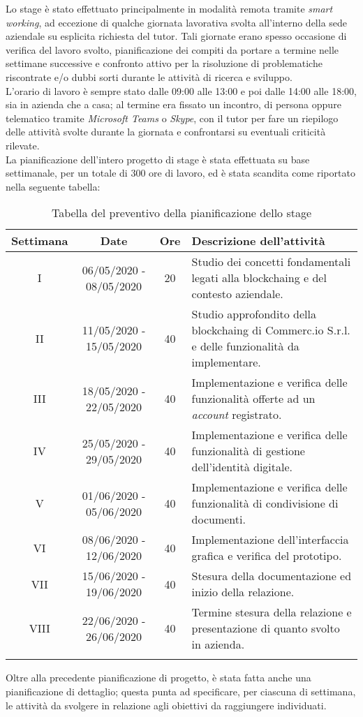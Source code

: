 Lo stage è stato effettuato principalmente in modalità remota tramite \textit{smart working}, ad eccezione di qualche giornata lavorativa svolta all'interno della sede aziendale su esplicita richiesta del tutor. Tali giornate erano spesso occasione di verifica del lavoro svolto, pianificazione dei compiti da portare a termine nelle settimane successive e confronto attivo per la risoluzione di problematiche riscontrate e/o dubbi sorti durante le attività di ricerca e sviluppo.\\
L'orario di lavoro è sempre stato dalle 09:00 alle 13:00 e poi dalle 14:00 alle 18:00, sia in azienda che a casa; al termine era fissato un incontro, di persona oppure telematico tramite \textit{Microsoft Teams} o \textit{Skype}, con il tutor per fare un riepilogo delle attività svolte durante la giornata e confrontarsi su eventuali criticità rilevate.\\
La pianificazione dell'intero progetto di stage è stata effettuata su base settimanale, per un totale di 300 ore di lavoro, ed è stata scandita come riportato nella seguente tabella:
\begin{longtable}{|c|c|c|p{5cm}|}
	\hline
	\rowcolor{gray}
	\textbf{Settimana} & \textbf{Date} & \textbf{Ore} & \textbf{Descrizione dell'attività} \\\hline
	I & 06/05/2020 - 08/05/2020 & 20 & Studio dei concetti fondamentali legati alla \gls{blockchaing} e del contesto aziendale. \\\hline
	II & 11/05/2020 - 15/05/2020 & 40 & Studio approfondito della \gls{blockchaing} di Commerc.io S.r.l. e delle funzionalità da implementare. \\\hline
	III & 18/05/2020 - 22/05/2020 & 40 & Implementazione e verifica delle funzionalità offerte ad un \textit{account} registrato. \\\hline
	IV & 25/05/2020 - 29/05/2020 & 40 & Implementazione e verifica delle funzionalità di gestione dell'identità digitale. \\\hline
	V & 01/06/2020 - 05/06/2020 & 40 & Implementazione e verifica delle funzionalità di condivisione di documenti. \\\hline
	VI & 08/06/2020 - 12/06/2020 & 40 & Implementazione dell'interfaccia grafica e verifica del prototipo. \\\hline
	VII & 15/06/2020 - 19/06/2020 & 40 & Stesura della documentazione ed inizio della relazione. \\\hline
	VIII & 22/06/2020 - 26/06/2020 & 40 & Termine stesura della relazione e presentazione di quanto svolto in azienda. \\\hline
	\caption{Tabella del preventivo della pianificazione dello stage}
	\label{tab:pianificazione}
\end{longtable}
\noindent
Oltre alla precedente pianificazione di progetto, è stata fatta anche una pianificazione di dettaglio; questa punta ad specificare, per ciascuna di settimana, le attività da svolgere in relazione agli obiettivi da raggiungere individuati.

